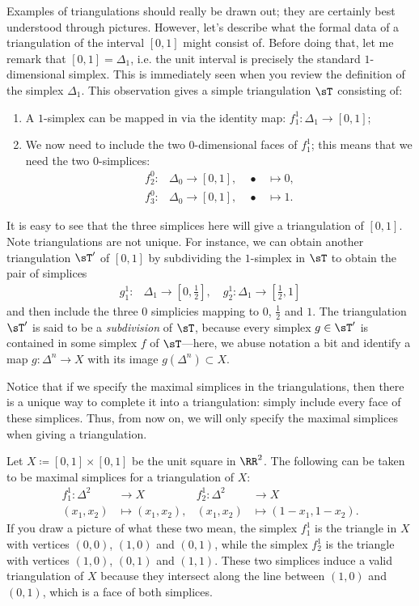 \documentclass{axolotl}
\begin{document}
Examples of triangulations should really be drawn out; they are certainly best
understood through pictures. However, let's describe what the formal data of a
triangulation of the interval \([0,1]\) might consist of. Before doing that,
let me remark that \([0,1] = \Delta_1\), i.e. the unit interval is precisely
the standard \(1\)-dimensional simplex. This is immediately seen when you review
the definition of the simplex \(\Delta_1\). This observation gives a simple
triangulation \(\sT\) consisting of:
\begin{enumerate}
  \item A \(1\)-simplex can be mapped in via the identity map: \(f_1^1:
      \Delta_1 \to [0,1]\);
  \item We now need to include the two \(0\)-dimensional faces of \(f_1^1\);
    this means that we need the two \(0\)-simplices:
    \begin{align*}
      f_2^0: & \Delta_0 \to [0,1], \quad \bullet & \mapsto 0, \\
      f_3^0: & \Delta_0 \to [0,1], \quad \bullet & \mapsto 1.
    \end{align*}
\end{enumerate}
It is easy to see that the three simplices here will give a triangulation of
\([0,1]\). Note triangulations are not unique. For instance, we can obtain
another triangulation \(\sT'\) of \([0,1]\) by subdividing the \(1\)-simplex in
\(\sT\) to obtain the pair of simplices
\begin{align*}
  g_1^1: & \Delta_1 \to \left[0,\frac{1}{2}\right], \quad g_2^1: \Delta_1 \to \left[\frac{1}{2},1\right]
\end{align*}
and then include the three \(0\) simplicies mapping to \(0\), \(\frac{1}{2}\)
and \(1\). The triangulation \(\sT'\) is said to be a \textit{subdivision} of
\(\sT\), because every simplex \(g \in \sT'\) is contained in some simplex
\(f\) of \(\sT\)---here, we abuse notation a bit and identify a map \(g:
  \Delta^n \to X\) with its image \(g(\Delta^n) \subset X\).

Notice that if we specify the maximal simplices in the triangulations, then there
is a unique way to complete it into a triangulation: simply include every face
of these simplices. Thus, from now on, we will only specify the maximal
simplices when giving a triangulation.

Let \(X \coloneqq [0,1] \times [0,1]\) be the unit square in \(\RR^2\). The following
can be taken to be maximal simplices for a triangulation of \(X\):
\begin{align*}
  f_1^1: \Delta^2 & \to X             & f_2^1: \Delta^2 & \to X \\
         (x_1,x_2) & \mapsto (x_1,x_2), & (x_1,x_2) & \mapsto (1 - x_1,1 - x_2).
\end{align*}
If you draw a picture of what these two mean, the simplex \(f_1^1\) is the
triangle in \(X\) with vertices \((0,0)\), \((1,0)\) and \((0,1)\), while the
simplex \(f_2^1\) is the triangle with vertices \((1,0)\), \((0,1)\) and
\((1,1)\). These two simplices induce a valid triangulation of \(X\) because
they intersect along the line between \((1,0)\) and \((0,1)\), which is a face
of both simplices.
\end{document}
